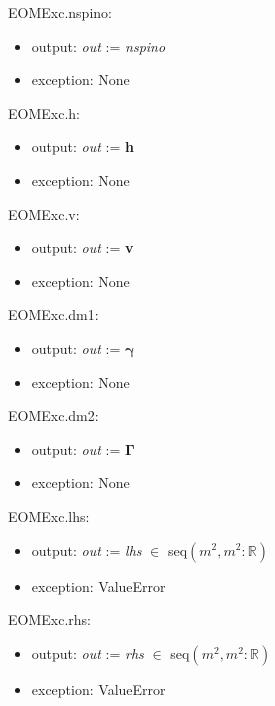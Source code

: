 \documentclass[12pt, titlepage]{article}
\begin{document}
\noindent EOMExc.nspino:
\begin{itemize}
	\item output: \textit{out} := \textit{nspino}
	\item exception: None
\end{itemize}

\noindent EOMExc.h:
\begin{itemize}
	\item output: \textit{out} := \textbf{h}
	\item exception: None
\end{itemize}

\noindent EOMExc.v:
\begin{itemize}
	\item output: \textit{out} := \textbf{v}
	\item exception: None
\end{itemize}

\noindent EOMExc.dm1:
\begin{itemize}
	\item output: \textit{out} := $\boldsymbol{\gamma}$
	\item exception: None
\end{itemize}

\noindent EOMExc.dm2:
\begin{itemize}
	\item output: \textit{out} := $\boldsymbol{\Gamma}$
	\item exception: None
\end{itemize}

\noindent EOMExc.lhs:
\begin{itemize}
	\item output: \textit{out} := \textit{lhs} $\in$ seq$(m^2,m^2:\mathbb{R})$
	\item exception: ValueError
\end{itemize}

\noindent EOMExc.rhs:
\begin{itemize}
	\item output: \textit{out} := \textit{rhs} $\in$ seq$(m^2,m^2:\mathbb{R})$
	\item exception: ValueError
\end{itemize}
\end{document}
